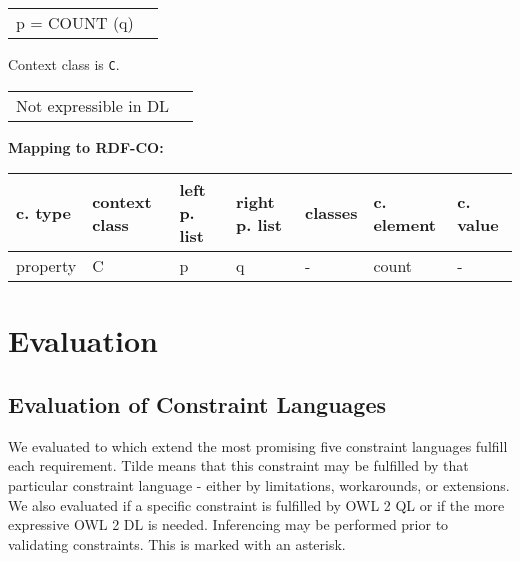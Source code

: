 \documentclass{llncs}
\newcommand{\ms}[1]{\texttt{#1}}
\newenvironment{gcotable}{
  \scriptsize
  \sffamily
  \vspace{0cm}
	\begin{center}
	\textbf{\vspace{0.4cm}Mapping to RDF-CO:} \\
  \begin{tabular}{l|l|l|l|l|l|l}
	\hline
  \textbf{c. type} & \textbf{context class} & \textbf{left p. list} & \textbf{right p. list} & \textbf{classes} & \textbf{c. element} & \textbf{c. value} \\
  \hline

}{
  \hline
  \end{tabular}
	\end{center}
}
\newenvironment{DL}{
  \vspace{0cm}
	\begin{center}
  \begin{tabular}{r l}

}{
  \end{tabular}
	\end{center}
}
\begin{document}
\begin{DL}
p = COUNT (q)
\end{DL}

Context class is \ms{C}.

\begin{DL}
Not expressible in DL
\end{DL}

\begin{gcotable}
property & C & p & q & - & count & - \\
\end{gcotable}

\section{Evaluation}

\subsection{Evaluation of Constraint Languages}
\label{sec:evaluation-1}

We evaluated to which extend the most promising five constraint languages fulfill each requirement.
Tilde means that this constraint may be fulfilled by that particular constraint language - either by limitations, workarounds, or extensions.
We also evaluated if a specific constraint is fulfilled by OWL 2 QL or if the more expressive OWL 2 DL is needed. 
Inferencing may be performed prior to validating constraints. This is marked with an asterisk.
\end{document}
